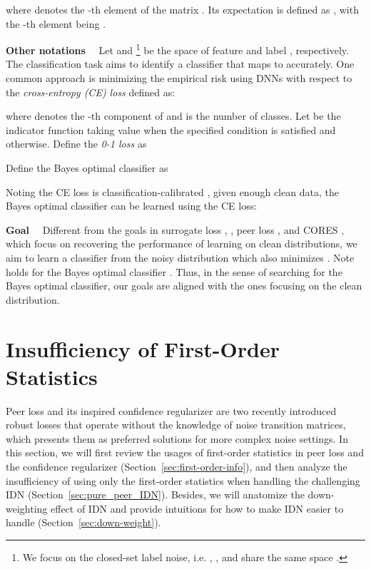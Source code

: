 \documentclass[final]{cvpr}
\begin{document}
where  denotes the -th element of the matrix . 
Its expectation is defined as , with the -th element being .

\noindent\textbf{Other notations}~~
Let  and \footnote{We focus on the closed-set label noise, i.e. , , and  share the same space .} be the space of feature  and label , respectively. 
The classification task aims to identify a classifier  that maps  to  accurately.
One common approach is minimizing the empirical risk using DNNs with respect to the \emph{cross-entropy (CE) loss} defined as:

where  denotes the -th component of  and  is the number of classes.
Let  be the indicator function taking value  when the specified condition is satisfied and  otherwise. Define the \emph{0-1 loss} as 

Define the Bayes optimal classifier  as 

Noting the CE loss is classification-calibrated \cite{bartlett2006convexity}, given enough clean data, the Bayes optimal classifier can be learned using the CE loss: 


\noindent\textbf{Goal}~~
Different from the goals in surrogate loss \cite{natarajan2013learning},  \cite{xu2019l_dmi}, peer loss \cite{liu2019peer}, and CORES \cite{sieve2020}, which focus on recovering the performance of learning on clean distributions, we aim to learn a classifier  from the noisy distribution  which also minimizes . 
Note  holds for the Bayes optimal classifier . Thus, in the sense of searching for the Bayes optimal classifier, our goals are aligned with the ones focusing on the clean distribution. 
 \section{Insufficiency of First-Order Statistics}\label{sec:cal}
Peer loss \cite{liu2019peer} and its inspired confidence regularizer \cite{sieve2020} are two recently introduced robust losses that operate without the knowledge of noise transition matrices, which presents them as preferred solutions for more complex noise settings. 
In this section, we will first review the usages of first-order statistics in peer loss and the confidence regularizer (Section~\ref{sec:first-order-info}), and then analyze the insufficiency of using only the first-order statistics when handling the challenging IDN (Section~\ref{sec:pure_peer_IDN}).
Besides, we will anatomize the down-weighting effect of IDN and provide intuitions for how to make IDN easier to handle (Section~\ref{sec:down-weight}).
\end{document}
